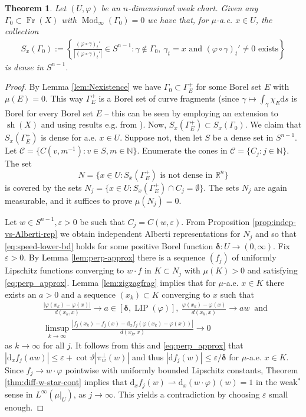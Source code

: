 \documentclass{amsart}
\newtheorem{theorem}{Theorem}[section]
\numberwithin{equation}{section}
\newcommand{\R}{\mathbb{R}}
\newcommand{\N}{\mathbb{N}}
\newcommand{\Mod}{\operatorname{Mod}}
\newcommand{\LIP}{\operatorname{LIP}}
\newcommand{\Fr}{\operatorname{Fr}}
\newcommand{\sh}{\operatorname{sh}}
\newcommand{\ud}{\mathrm {d}}
\begin{document}
\begin{theorem}\label{thm:density_of_directions}
Let $(U,\varphi)$ be an $n$-dimensional weak chart. Given any $\Gamma_0\subset\Fr(X)$ with $\Mod_\infty(\Gamma_0)=0$ we have that, for $\mu$-a.e. $x\in U$, the collection
\begin{align*}
S_x(\Gamma_0):=\left\{\frac{(\varphi\circ\gamma)_t'}{|(\varphi\circ\gamma)_t'|}\in S^{n-1}: \gamma\notin\Gamma_0,\ \gamma_t=x\textrm{ and $(\varphi\circ\gamma)_t'\neq 0$ exists} \right\}
\end{align*}
is dense in $S^{n-1}$.
\end{theorem}
\begin{proof}
By Lemma \ref{lem:Nexistence} we have $\Gamma_0 \subset \Gamma^+_E$ for some Borel set $E$ with $\mu(E)=0$. This way $\Gamma^+_E$ is a Borel set of curve fragments (since $\gamma \mapsto \int_\gamma \chi_E \ud s$ is Borel for every Borel set $E$ -- this can be seen  by employing an extension to $\sh(X)$ and using results e.g. from \cite[Appendix]{teriseb}). Now, $S_x(\Gamma^+_E)\subset S_x(\Gamma_0)$. We claim that $S_x(\Gamma^+_E)$ is dense for a.e. $x\in U$. Suppose not, then let $S$ be a dense set in $S^{n-1}$. Let $\mathcal{C}=\{C(v,m^{-1}): v\in S, m\in \N\}$. Enumerate the cones in $\mathcal{C}=\{C_j: j\in \N\}$. The set 
\[
N=\{x \in U: S_x(\Gamma^+_E) \text{ is not dense in } \R^n\}\]
is covered by the sets $N_j = \{x\in U : S_x(\Gamma_E^+)\cap C_j=\emptyset\}$.
The sets $N_j$ are again measurable, and it suffices to prove $\mu(N_j)=0$.

Let $w\in S^{n-1},\varepsilon>0$ be such that $C_j=C(w,\varepsilon)$. From Proposition \ref{prop:indep-vs-Alberti-rep} we obtain independent Alberti representations for $N_j$ and so that \eqref{eq:speed-lower-bd} holds for some positive Borel function $\bm\delta:U\to (0,\infty)$. 
Fix $\varepsilon>0$. By Lemma \ref{lem:perp-approx} there is a sequence $(f_j)$ of uniformly Lipschitz functions converging to $w\cdot f$ in $K\subset N_j$ with $\mu(K)>0$  and satisfying \eqref{eq:perp_approx}. Lemma \ref{lem:zigzagfrag} implies that for  $\mu$-a.e. $x\in K$ there exists an $a>0$ and a sequence $(x_k)\subset K$ converging to $x$ such that 
\begin{align*}
&\frac{|\varphi(x_k)-\varphi(x)|}{d(x_k,x)}\to a\in [\bm\delta,\LIP(\varphi)],\ \frac{\varphi(x_k)-\varphi(x)}{d(x_k,x)}\to aw\ \textrm{ and }\\ 
& \limsup_{k\to \infty}\frac{|f_j(x_k)-f_j(x)-\ud_xf_j(\varphi(x_k)-\varphi(x))|}{d(x_k,x)}\to 0
\end{align*}
as $k\to\infty$ for all $j$. It follows from this and \eqref{eq:perp_approx} that $|\ud_x f_j(aw)|\le \varepsilon + \cot\vartheta|\pi_w^\perp(w)|$ and thus $|\ud f_j(w)|\le \varepsilon/\bm\delta$ for $\mu$-a.e. $x\in K$. Since $f_j\to w\cdot \varphi$ pointwise with uniformly bounded Lipschitz constants, Theorem \ref{thm:diff-w-star-cont} implies that $\ud_xf_j(w)\rightharpoonup \ud_x(w\cdot\varphi)(w)=1$ in the weak$^\ast$ sense in $L^\infty(\mu|_U)$, as $j\to \infty$. This yields a contradiction by choosing $\varepsilon$ small enough.
\end{proof}
\end{document}
